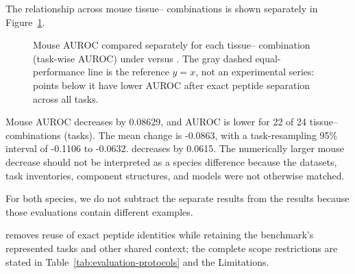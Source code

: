 The relationship across mouse tissue--\plainHtwo{} combinations is shown separately in Figure~\ref{fig:mouse-standard-strict-scatter}.
\begin{figure}[tbp]
\centering
{}
\caption{Mouse AUROC compared separately for each tissue--\plainHtwo{} combination (task-wise AUROC) under \plainMatchedOOF{} versus \plainPeptideOOF{}. The gray dashed equal-performance line is the reference $y=x$, not an experimental series: points below it have lower AUROC after exact peptide separation across all tasks.}
\label{fig:mouse-standard-strict-scatter}
\end{figure}

Mouse AUROC decreases by 0.08629, and \plainPeptideOOF{} AUROC is lower for 22 of 24 tissue--\plainHtwo{} combinations (tasks). The mean change is -0.0863, with a task-resampling 95\% interval of -0.1106 to -0.0632. \plainPairAcc{} decreases by 0.0615. The numerically larger mouse decrease should not be interpreted as a species difference because the datasets, task inventories, component structures, and models were not otherwise matched.

For both species, we do not subtract the separate \plainFixedTest{} results from the \plainPeptideOOF{} results because those evaluations contain different examples.

\plainPeptideOOF{} removes reuse of exact peptide identities while retaining the benchmark's represented tasks and other shared context; the complete scope restrictions are stated in Table~\ref{tab:evaluation-protocols} and the Limitations.

